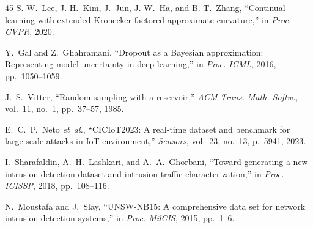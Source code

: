 \documentclass[journal]{IEEEtran}
\theoremstyle{definition}
\theoremstyle{remark}
\begin{document}
\begin{thebibliography}{45}
S.-W.~Lee, J.-H.~Kim, J.~Jun, J.-W.~Ha, and B.-T.~Zhang,
``Continual learning with extended {Kronecker}-factored approximate curvature,''
in \emph{Proc. CVPR}, 2020.

Y.~Gal and Z.~Ghahramani,
``Dropout as a {B}ayesian approximation: Representing model uncertainty in deep learning,''
in \emph{Proc. ICML}, 2016, pp.~1050--1059.

J.~S.~Vitter,
``Random sampling with a reservoir,''
\emph{ACM Trans. Math. Softw.}, vol.~11, no.~1, pp.~37--57, 1985.

E.~C.~P.~Neto \textit{et~al.},
``{CICIoT2023}: A real-time dataset and benchmark for large-scale attacks in {IoT} environment,''
\emph{Sensors}, vol.~23, no.~13, p.~5941, 2023.

I.~Sharafaldin, A.~H.~Lashkari, and A.~A.~Ghorbani,
``Toward generating a new intrusion detection dataset and intrusion traffic characterization,''
in \emph{Proc. ICISSP}, 2018, pp.~108--116.

N.~Moustafa and J.~Slay,
``{UNSW-NB15}: A comprehensive data set for network intrusion detection systems,''
in \emph{Proc. MilCIS}, 2015, pp.~1--6.

\end{thebibliography}
\end{document}
